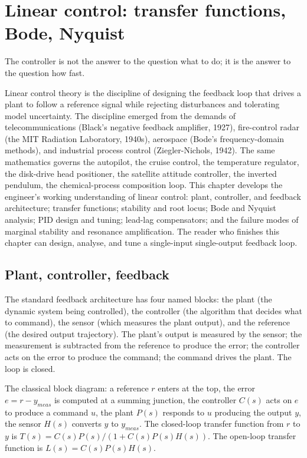\chapter{Linear control: transfer functions, Bode, Nyquist}
\label{vol09:ch02}

\epigraph{The controller is not the answer to the question what to do; it is the answer to the question how fast.}{}


\noindent
Linear control theory is the discipline of designing the feedback loop that drives a plant to follow a reference signal while rejecting disturbances and tolerating model uncertainty. The discipline emerged from the demands of telecommunications (Black's negative feedback amplifier, 1927), fire-control radar (the MIT Radiation Laboratory, 1940s), aerospace (Bode's frequency-domain methods), and industrial process control (Ziegler-Nichols, 1942). The same mathematics governs the autopilot, the cruise control, the temperature regulator, the disk-drive head positioner, the satellite attitude controller, the inverted pendulum, the chemical-process composition loop. This chapter develops the engineer's working understanding of linear control: plant, controller, and feedback architecture; transfer functions; stability and root locus; Bode and Nyquist analysis; PID design and tuning; lead-lag compensators; and the failure modes of marginal stability and resonance amplification. The reader who finishes this chapter can design, analyse, and tune a single-input single-output feedback loop.

\section{Plant, controller, feedback}

The standard feedback architecture has four named blocks: the plant (the dynamic system being controlled), the controller (the algorithm that decides what to command), the sensor (which measures the plant output), and the reference (the desired output trajectory). The plant's output is measured by the sensor; the measurement is subtracted from the reference to produce the error; the controller acts on the error to produce the command; the command drives the plant. The loop is closed.

The classical block diagram: a reference $r$ enters at the top, the error $e = r - y_{meas}$ is computed at a summing junction, the controller $C(s)$ acts on $e$ to produce a command $u$, the plant $P(s)$ responds to $u$ producing the output $y$, the sensor $H(s)$ converts $y$ to $y_{meas}$. The closed-loop transfer function from $r$ to $y$ is $T(s) = C(s) P(s) / (1 + C(s) P(s) H(s))$. The open-loop transfer function is $L(s) = C(s) P(s) H(s)$.

